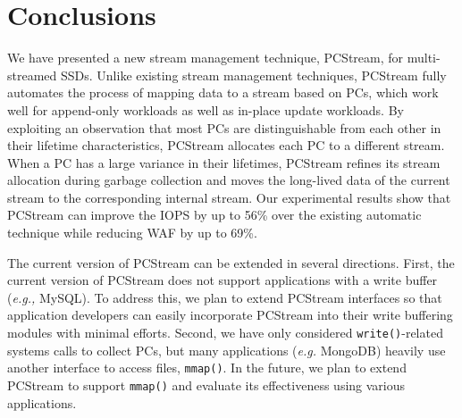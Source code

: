 \vspace{-10pt}
\section{Conclusions}
\vspace{-5pt}

We have presented a new stream management technique, \textsf{\small PCStream},
for multi-streamed SSDs.  Unlike existing stream management techniques,
\textsf{\small PCStream} fully automates the process of mapping data to a
stream based on PCs, which work well for append-only workloads as well as
in-place update workloads.  By exploiting an observation that most PCs are
distinguishable from each other in their lifetime characteristics,
\textsf{\small PCStream} allocates each PC to a different stream.  When a PC
has a large variance in their lifetimes, \textsf{\small PCStream} refines its
stream allocation during garbage collection and moves the long-lived data of
the current stream to the corresponding internal stream.  Our experimental
results show that \textsf{\small PCStream} can improve the IOPS by up to 56\% over 
the existing automatic technique while reducing WAF by up to 69\%. 

The current version of \textsf{\small PCStream} can be extended in several
directions.  First, the current version of PCStream does not support
applications with a write buffer ({\it e.g.,} MySQL). To address this, we plan
to extend PCStream interfaces so that application developers can easily
incorporate PCStream into their write buffering modules with minimal efforts.
Second, we have only considered \texttt{write()}-related systems calls to
collect PCs, but many applications ({\it e.g.} MongoDB) heavily use another
interface to access files, \texttt{mmap()}. In the future, we plan to extend
PCStream to support \texttt{mmap()} and evaluate its effectiveness using
various applications.
